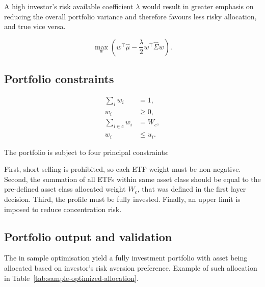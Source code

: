 \documentclass[11pt,a4paper]{article}
\begin{document}
A high investor's risk available coefficient $\lambda$ would result in greater emphasis on reducing the overall portfolio variance and therefore favours less risky allocation, and true vice versa.

\begin{equation}
  \max_w\left(
    w^{\top}\hat\mu-
    \frac{\lambda}{2}w^{\top}\hat\Sigma w
  \right).
\end{equation}

\subsection{Portfolio constraints}

\begin{align}
  \sum_i w_i &= 1, \\
  w_i &\geq 0, \\
  \sum_{i\in c}w_i &= W_c, \\
  w_i &\leq u_i.
\end{align}

The portfolio is subject to four principal constraints:

First, short selling is prohibited, so each ETF weight must be non-negative. Second, the summation of all ETFs within same asset class should be equal to the pre-defined asset class allocated weight $W_c$, that was defined in the first layer decision. Third, the profile must be fully invested. Finally, an upper limit is imposed to reduce concentration risk.

\subsection{Portfolio output and validation}

The in sample optimisation yield a fully investment portfolio with asset being allocated based on investor's risk aversion preference. Example of such allocation in Table~\ref{tab:sample-optimized-allocation}.
\end{document}
